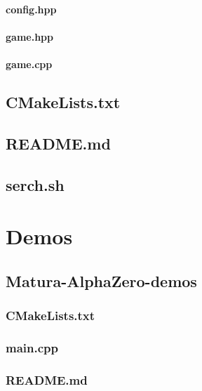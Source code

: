 \documentclass[12pt]{article}
\newcommand{\incFile}[2]{\label{code:#2}\newpage}
\newcommand{\incDemo}[2]{\label{demo:#2}\newpage}
\begin{document}
\paragraph{config.hpp}													\incFile{C++}{games/othello/config.hpp}
\paragraph{game.hpp}													\incFile{C++}{games/othello/game.hpp}
\paragraph{game.cpp}													\incFile{C++}{games/othello/game.cpp}

\subsection{CMakeLists.txt}											\incFile{python}{CMakeLists.txt}
\subsection{README.md}												\incFile{python}{README.md}
\subsection{serch.sh}														\incFile{sh}{serch.sh}

\section{Demos}
\subsection{Matura-AlphaZero-demos}
\subsubsection{CMakeLists.txt}										\incDemo{python}{CMakeLists.txt}
\subsubsection{main.cpp}												\incDemo{c++}{main.cpp}
\subsubsection{README.md}										\incDemo{python}{README.md}
\end{document}
